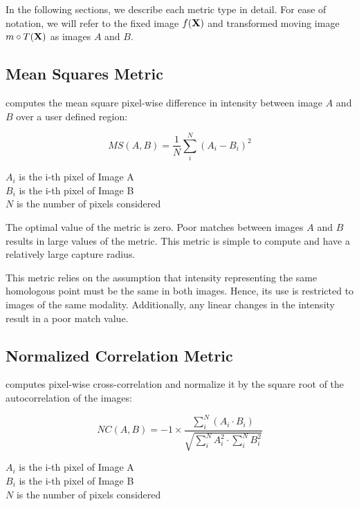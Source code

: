 In the following sections, we describe each metric type in detail. 
For ease of notation, we will refer to the fixed image $f(\bf{X})$ 
and transformed moving image $m \circ T(\bf{X})$ as images $A$ and $B$.

\subsection{Mean Squares Metric}
\label{sec:MeanSquaresMetric}
 computes the mean square pixel-wise difference in intensity
between image $A$ and $B$ over a user defined region:

\begin{equation}
MS(A,B) = \frac{1}{N} \sum_i^N \left( A_i - B_i \right)^2
\end{equation}
\begin{center}
$A_i$ is the i-th pixel of Image A\\ 
$B_i$ is the i-th pixel of Image B\\
$N$ is the number of pixels considered
\end{center}

The optimal value of the metric is zero. Poor matches between images $A$ and
$B$ results in large values of the metric. This metric is simple to compute and
have a relatively large capture radius.

This metric relies on the assumption that intensity representing the same
homologous point must be the same in both images. Hence, its use is restricted
to images of the same modality. Additionally, any linear changes in the
intensity result in a poor match value.

\subsection{Normalized Correlation Metric}
\label{sec:NormalizedCorrelationMetric}
 computes pixel-wise
cross-correlation and normalize it by the square root of the autocorrelation of
the images:

\begin{equation}
NC(A,B) = -1 \times \frac{ \sum_i^N \left( A_i \cdot B_i \right) }
         { \sqrt { \sum_i^N A_i^2  \cdot \sum_i^N B_i^2 } }
\end{equation}
\begin{center}
$A_i$ is the i-th pixel of Image A\\ 
$B_i$ is the i-th pixel of Image B\\
$N$ is the number of pixels considered
\end{center}

